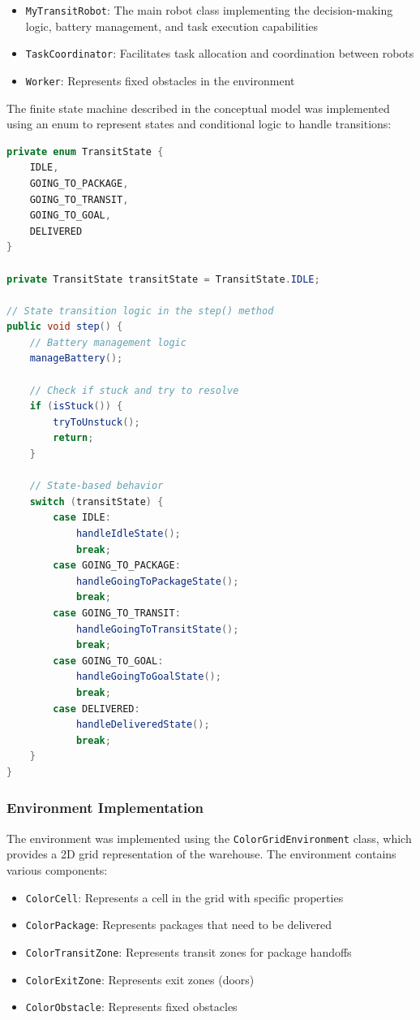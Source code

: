 \documentclass[12pt,a4paper]{article}
\begin{document}
\begin{itemize}
    \item \texttt{MyTransitRobot}: The main robot class implementing the decision-making logic, battery management, and task execution capabilities
    \item \texttt{TaskCoordinator}: Facilitates task allocation and coordination between robots
    \item \texttt{Worker}: Represents fixed obstacles in the environment
\end{itemize}

The finite state machine described in the conceptual model was implemented using an enum to represent states and conditional logic to handle transitions:

\begin{lstlisting}[language=Java, caption=Robot State Implementation]
private enum TransitState {
    IDLE,
    GOING_TO_PACKAGE,
    GOING_TO_TRANSIT,
    GOING_TO_GOAL,
    DELIVERED
}

private TransitState transitState = TransitState.IDLE;

// State transition logic in the step() method
public void step() {
    // Battery management logic
    manageBattery();

    // Check if stuck and try to resolve
    if (isStuck()) {
        tryToUnstuck();
        return;
    }

    // State-based behavior
    switch (transitState) {
        case IDLE:
            handleIdleState();
            break;
        case GOING_TO_PACKAGE:
            handleGoingToPackageState();
            break;
        case GOING_TO_TRANSIT:
            handleGoingToTransitState();
            break;
        case GOING_TO_GOAL:
            handleGoingToGoalState();
            break;
        case DELIVERED:
            handleDeliveredState();
            break;
    }
}
\end{lstlisting}

\subsubsection{Environment Implementation}
The environment was implemented using the \texttt{ColorGridEnvironment} class, which provides a 2D grid representation of the warehouse. The environment contains various components:

\begin{itemize}
    \item \texttt{ColorCell}: Represents a cell in the grid with specific properties
    \item \texttt{ColorPackage}: Represents packages that need to be delivered
    \item \texttt{ColorTransitZone}: Represents transit zones for package handoffs
    \item \texttt{ColorExitZone}: Represents exit zones (doors)
    \item \texttt{ColorObstacle}: Represents fixed obstacles
\end{itemize}
\end{document}

